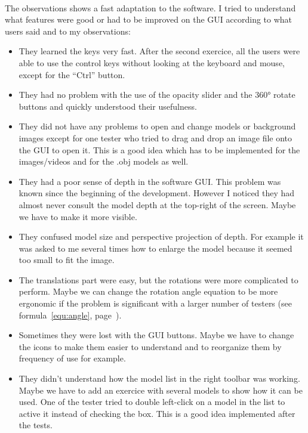 \documentclass[12pt]{report}
\begin{document}
\paragraph{}
The observations shows a fast adaptation to the software. I tried to understand what features were good or had to be improved on the GUI according to what users said and to my observations:
\begin{itemize}
\item They learned the keys very fast. After the second exercice, all the users were able to use the control keys without looking at the keyboard and mouse, except for the ``Ctrl'' button.
\item They had no problem with the use of the opacity slider and the 360° rotate buttons and quickly understood their usefulness.
\item They did not have any problems to open and change models or background images except for one tester who tried to drag and drop an image file onto the GUI to open it. This is a good idea which has to be implemented for the images/videos and for the .obj models as well.
\item They had a poor sense of depth in the software GUI. This problem was known since the beginning of the development. However I noticed they had almost never consult the model depth at the top-right of the screen. Maybe we have to make it more visible.
\item They confused model size and perspective projection of depth. For example it was asked to me several times how to enlarge the model because it seemed too small to fit the image.
\item The translations part were easy, but the rotations were more complicated to perform. Maybe we can change the rotation angle equation to be more ergonomic if the problem is significant with a larger number of testers (see formula~\ref{equ:angle}, page~\pageref{equ:angle}).
\item Sometimes they were lost with the GUI buttons. Maybe we have to change the icons to make them easier to understand and to reorganize them by frequency of use for example.
\item They didn't understand how the model list in the right toolbar was working. Maybe we have to add an exercice with several models to show how it can be used. One of the tester tried to double left-click on a model in the list to active it instead of checking the box. This is a good idea implemented after the tests.
\end{itemize}
\end{document}
